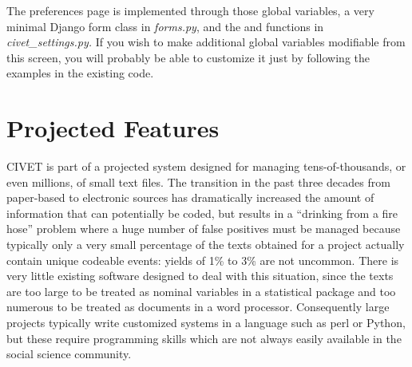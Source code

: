 \documentclass[letterpaper,10pt,english]{sphinxmanual}
\begin{document}
The preferences page is implemented through those global variables, a very
minimal Django form class  in \emph{forms.py}, and the 
and  functions in \emph{civet\_settings.py.}  If you wish
to make additional global variables modifiable from this screen,  you will probably be able to
customize it just by following the examples in the existing code.


\chapter{Projected Features}
\label{future::doc}\label{future:projected-features}
CIVET is part of a projected system designed for managing
tens-of-thousands, or even millions, of small text files. The transition
in the past three decades from paper-based to electronic sources has
dramatically increased the amount of information that can potentially be
coded, but results in a “drinking from a fire hose” problem where a huge
number of false positives must be managed because typically only a very
small percentage of the texts obtained for a project actually contain
unique codeable events: yields of 1\% to 3\% are not uncommon. There is
very little existing software designed to deal with this situation,
since the texts are too large to be treated as nominal variables in a
statistical package and too numerous to be treated as documents in a
word processor. Consequently large projects typically write customized
systems in a language such as perl or Python, but these require
programming skills which are not always easily available in the social
science community.
\end{document}
